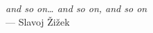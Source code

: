 \thispagestyle{empty}
{}

\vspace*{3cm}

\begin{center}
    \emph{and so on\ldots{} and so on, and so on}\\ \medskip
    --- Slavoj Žižek
\end{center}
